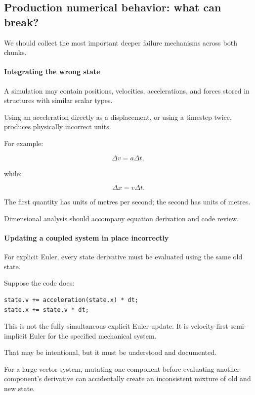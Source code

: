 \subsection{Production numerical behavior: what can break?}\label{02-foundations-ii-ch022-production-numerical-behavior-what-can-break}

We should collect the most important deeper failure mechanisms across both chunks.

\paragraph{Integrating the wrong state}\label{02-foundations-ii-ch022-integrating-the-wrong-state}

A simulation may contain positions, velocities, accelerations, and forces stored in structures with similar scalar types.

Using an acceleration directly as a displacement, or using a timestep twice, produces physically incorrect units.

For example:

\[
\Delta v=a\Delta t,
\]

while:

\[
\Delta x=v\Delta t.
\]

The first quantity has units of metres per second; the second has units of metres.

Dimensional analysis should accompany equation derivation and code review.

\paragraph{Updating a coupled system in place incorrectly}\label{02-foundations-ii-ch022-updating-a-coupled-system-in-place-incorrectly}

For explicit Euler, every state derivative must be evaluated using the same old state.

Suppose the code does:

\begin{verbatim}
state.v += acceleration(state.x) * dt;
state.x += state.v * dt;
\end{verbatim}

This is not the fully simultaneous explicit Euler update. It is velocity-first semi-implicit Euler for the specified mechanical system.

That may be intentional, but it must be understood and documented.

For a large vector system, mutating one component before evaluating another component's derivative can accidentally create an inconsistent mixture of old and new state.

